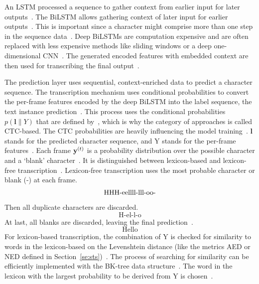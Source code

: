 An \ac{LSTM} processed a sequence to gather context from earlier input for later
outputs~\citep{shi_end--end_2017,goodfellow_deep_2016}.
The \ac{BiLSTM} allows gathering context of later input for earlier outputs~\citep{shi_end--end_2017}.
This is important since a character might comprise more than one step in the sequence
data~\citep{shi_end--end_2017}.
Deep \acp{BiLSTM} are computation expensive and are often replaced with less expensive
methods like sliding windows or a deep one-dimensional \ac{CNN}~\citep{chen_text_2021}.
The generated encoded features with embedded context are then used for transcribing the final
output~\citep{shi_end--end_2017}.

The prediction layer uses sequential, context-enriched data to predict a character sequence.
The transcription mechanism uses conditional probabilities to convert the per-frame features
encoded by the deep \ac{BiLSTM} into the label sequence, the text instance
prediction~\citep{shi_end--end_2017}.
This process uses the conditional probabilities $p(\textbf{l}\|Y)$ that are defined
by~\cite{graves_connectionist_2006}, which is why the category of approaches is called
\ac{CTC}-based.
The \ac{CTC} probabilities are heavily influencing the model
training~\citep{shi_end--end_2017,graves_connectionist_2006}.
$\textbf{l}$ stands for the predicted character sequence, and Y stands for the per-frame
features~\citep{shi_end--end_2017}.
Each frame $\textbf{y}^{(t)}$ is a probability distribution over the possible character and a `blank'
character~\citep{shi_end--end_2017,graves_connectionist_2006}.
It is distinguished between lexicon-based and lexicon-free transcription~\citep{shi_end--end_2017}.
Lexicon-free transcription uses the most probable character or blank (-) at each frame.
\[\text{HHH-eellll-lll-\-oo-\-\-}\]
Then all duplicate characters are discarded.
\[\text{H-el-l-o}\]
At last, all blanks are discarded, leaving the final prediction~\citep{shi_end--end_2017}.
\[\text{Hello}\]
For lexicon-based transcription, the combination of Y is checked for similarity to words in the
lexicon-based on the Levenshtein distance (like the metrics \ac{AED} or \ac{NED} defined in
Section~\ref{se:sts})~\citep{shi_end--end_2017}.
The process of searching for similarity can be efficiently implemented with the BK-tree data
structure~\citep{burkhard_approaches_1973,shi_end--end_2017}.
The word in the lexicon with the largest probability to be derived from Y is
chosen~\citep{shi_end--end_2017}.

